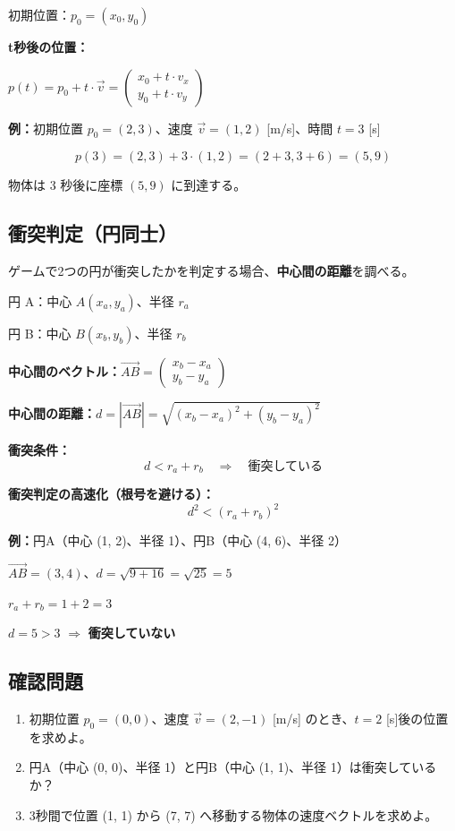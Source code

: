 \documentclass[paper=a4,fleqn]{jlreq}
\newcommand{\formula}[1]{%
  \vspace{4pt}%
  \begin{center}{\large\bfseries\boldmath\(\displaystyle #1\)}\end{center}%
  \vspace{4pt}%
}
\begin{document}
初期位置：\(p_0 = (x_0, y_0)\)

\textbf{t秒後の位置：}

\formula{p(t) = p_0 + t \cdot \vec{v} = \begin{pmatrix} x_0 + t \cdot v_x \\ y_0 + t \cdot v_y \end{pmatrix}}

\textbf{例：}初期位置 \(p_0 = (2, 3)\)、速度 \(\vec{v} = (1, 2)\) [m/s]、時間 \(t = 3\) [s]

\[p(3) = (2, 3) + 3 \cdot (1, 2) = (2 + 3, 3 + 6) = (5, 9)\]

物体は 3 秒後に座標 \((5, 9)\) に到達する。

\subsection{衝突判定（円同士）}

ゲームで2つの円が衝突したかを判定する場合、\textbf{中心間の距離}を調べる。

円 A：中心 \(A(x_a, y_a)\)、半径 \(r_a\)

円 B：中心 \(B(x_b, y_b)\)、半径 \(r_b\)

\textbf{中心間のベクトル：}\(\overrightarrow{AB} = \begin{pmatrix} x_b - x_a \\ y_b - y_a \end{pmatrix}\)

\textbf{中心間の距離：}\(d = |\overrightarrow{AB}| = \sqrt{(x_b - x_a)^2 + (y_b - y_a)^2}\)

\textbf{衝突条件：}
\[
  d < r_a + r_b \quad \Rightarrow \quad \text{衝突している}
\]

\textbf{衝突判定の高速化（根号を避ける）：}
\[
  d^2 < (r_a + r_b)^2
\]

\textbf{例：}円A（中心 (1, 2)、半径 1）、円B（中心 (4, 6)、半径 2）

\(\overrightarrow{AB} = (3, 4)\)、\(d = \sqrt{9 + 16} = \sqrt{25} = 5\)

\(r_a + r_b = 1 + 2 = 3\)

\(d = 5 > 3\) \(\Rightarrow\) \textbf{衝突していない}

\subsection{確認問題}
\begin{enumerate}
  \item 初期位置 \(p_0 = (0, 0)\)、速度 \(\vec{v} = (2, -1)\) [m/s] のとき、\(t = 2\) [s]後の位置を求めよ。
  \item 円A（中心 (0, 0)、半径 1）と円B（中心 (1, 1)、半径 1）は衝突しているか？
  \item 3秒間で位置 (1, 1) から (7, 7) へ移動する物体の速度ベクトルを求めよ。
\end{enumerate}
\end{document}
